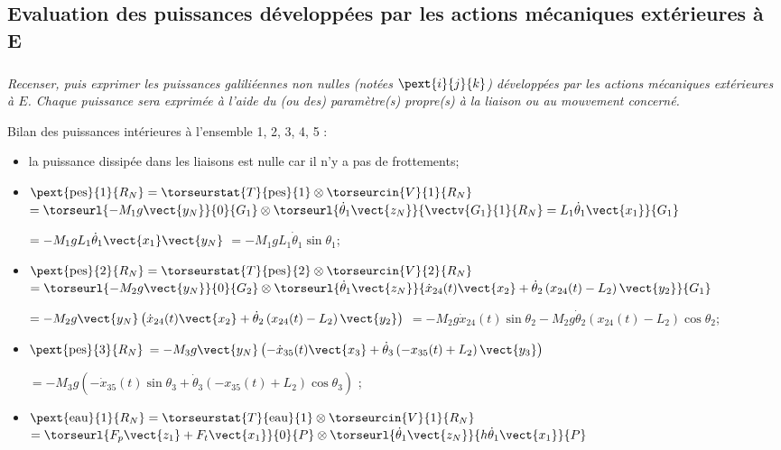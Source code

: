 \begin{multicols}{2}
\begin{corrige}
\end{corrige}
\else
\fi


\subsection*{Evaluation des puissances développées par les actions mécaniques extérieures à E}
\subparagraph{}\textit{Recenser, puis exprimer les puissances galiliéennes non nulles (notées $\pext{i}{j}{k}$) développées par les actions mécaniques extérieures à $E$. Chaque puissance sera exprimée à l’aide du (ou des)
paramètre(s) propre(s) à la liaison ou au mouvement concerné.}
\ifprof
\begin{corrige}
Bilan des puissances intérieures à l'ensemble 1, 2, 3, 4, 5 :
\begin{itemize}
\item la puissance dissipée dans les liaisons est nulle car il n'y a pas de frottements;
\item  $\pext{\text{pes}}{1}{R_N} = \torseurstat{T}{\text{pes}}{1}\otimes \torseurcin{V}{1}{R_N}$ 
$=\torseurl{-M_1g\vect{y_N}}{0}{G_1}\otimes \torseurl{\dot{\theta}_1\vect{z_N}}{\vectv{G_1}{1}{R_N}=L_1 \dot{\theta}_1\vect{x_1}}{G_1}$ 

 $=-M_1gL_1 \dot{\theta}_1\vect{x_1}\vect{y_N}$ $=-M_1gL_1 \dot{\theta}_1\sin \theta_1$;

\item  $\pext{\text{pes}}{2}{R_N} = \torseurstat{T}{\text{pes}}{2}\otimes \torseurcin{V}{2}{R_N}$ 
$=\torseurl{-M_2g\vect{y_N}}{0}{G_2}\otimes \torseurl{\dot{\theta}_1\vect{z_N}}{ \dot{x}_{24}(t)  \vect{x_2}+\dot{\theta}_2\left(  x_{24}(t)  -L_2 \right)\vect{y_2}}{G_1}$ 

 $= -M_2g\vect{y_N}\left(\dot{x}_{24}(t)  \vect{x_2}+\dot{\theta}_2\left(  x_{24}(t)  -L_2 \right)\vect{y_2}\right)$ $= -M_2g\dot{x}_{24}(t) \sin \theta_2-M_2g\dot{\theta}_2\left(  x_{24}(t)  -L_2 \right)\cos \theta_2$;

\item  $\pext{\text{pes}}{3}{R_N} $
 $= -M_3g\vect{y_N}\left(-\dot{x}_{35}(t)  \vect{x_3}+\dot{\theta}_3\left( - x_{35}(t)  +L_2 \right)\vect{y_3}\right)$
 
  $= -M_3g\left(-\dot{x}_{35}(t)  \sin\theta_3+\dot{\theta}_3\left( - x_{35}(t)  +L_2 \right)\cos\theta_3\right)$ ;
 
  
\item  $\pext{\text{eau}}{1}{R_N} = \torseurstat{T}{\text{eau}}{1}\otimes \torseurcin{V}{1}{R_N}$ 
$=\torseurl{F_p \vect{z_1}+F_t \vect{x_1}}{0}{P}\otimes \torseurl{\dot{\theta}_1\vect{z_N}}{h \dot{\theta}_1\vect{x_1}}{P}$ 


\end{itemize}
\end{corrige}
\end{multicols}

